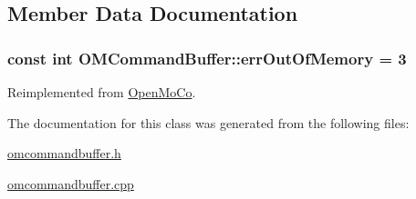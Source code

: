 \subsection{Member Data Documentation}
\hypertarget{class_o_m_command_buffer_a529b47966a6c91743ea5e4f1d584b1f2}{
\subsubsection[{errOutOfMemory}]{\setlength{\rightskip}{0pt plus 5cm}const int {\bf OMCommandBuffer::errOutOfMemory} = 3}}
\label{class_o_m_command_buffer_a529b47966a6c91743ea5e4f1d584b1f2}


Reimplemented from \hyperlink{class_open_mo_co_a0b6b40784caadf923e620295b47d6c39}{OpenMoCo}.



The documentation for this class was generated from the following files:\begin{DoxyCompactItemize}
\item 
\hyperlink{omcommandbuffer_8h}{omcommandbuffer.h}\item 
\hyperlink{omcommandbuffer_8cpp}{omcommandbuffer.cpp}\end{DoxyCompactItemize}

